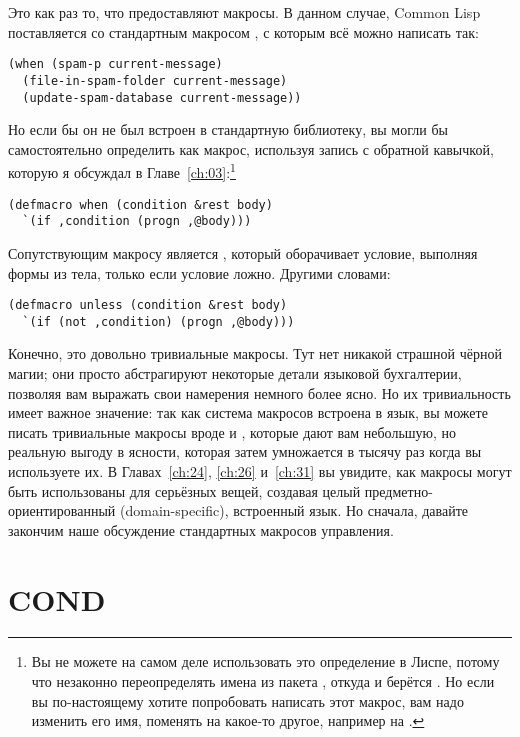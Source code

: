 Это как раз то, что предоставляют макросы. В данном случае, Common Lisp поставляется со
стандартным макросом , с которым всё можно написать так:

\begin{lstlisting}
(when (spam-p current-message)
  (file-in-spam-folder current-message)
  (update-spam-database current-message))
\end{lstlisting}

Но если бы он не был встроен в стандартную библиотеку, вы могли бы самостоятельно
определить  как макрос, используя запись с обратной кавычкой, которую я
обсуждал в Главе~\ref{ch:03}:\footnote{Вы не можете на самом деле использовать это определение в
  Лиспе, потому что незаконно переопределять имена из пакета , откуда и
  берётся . Но если вы по-настоящему хотите попробовать написать этот макрос,
  вам надо изменить его имя, поменять на какое-то другое, например на .}

\begin{lstlisting}
(defmacro when (condition &rest body)
  `(if ,condition (progn ,@body)))
\end{lstlisting}

Сопутствующим макросу  является , который оборачивает условие,
выполняя формы из тела, только если условие ложно. Другими словами:

\begin{lstlisting}
(defmacro unless (condition &rest body)
  `(if (not ,condition) (progn ,@body)))
\end{lstlisting}

Конечно, это довольно тривиальные макросы. Тут нет никакой страшной чёрной магии; они
просто абстрагируют некоторые детали языковой бухгалтерии, позволяя вам выражать свои
намерения немного более ясно. Но их тривиальность имеет важное значение: так как система
макросов встроена в язык, вы можете писать тривиальные макросы вроде  и
, которые дают вам небольшую, но реальную выгоду в ясности, которая затем
умножается в тысячу раз когда вы используете их. В Главах~\ref{ch:24}, \ref{ch:26}
и~\ref{ch:31} вы увидите, как макросы могут быть использованы для серьёзных вещей,
создавая целый предметно-ориентированный (domain-specific), встроенный язык. Но сначала,
давайте закончим наше обсуждение стандартных макросов управления.

\section{COND}


